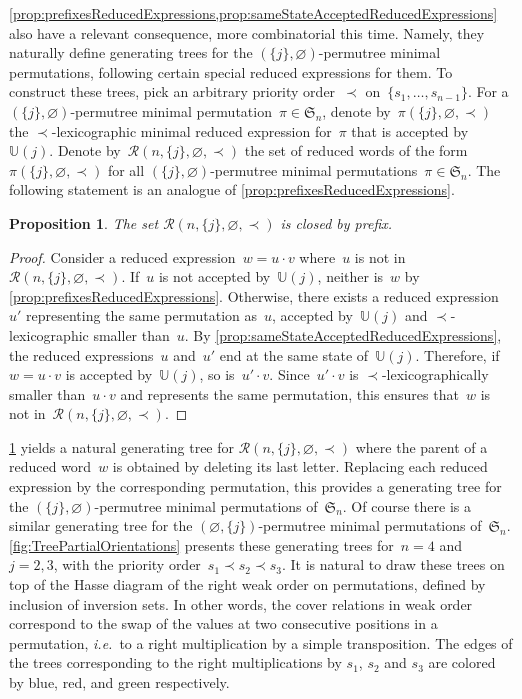 \documentclass{amsart}
\newtheorem{proposition}[theorem]{Proposition}
\newcommand{\fS}{\mathfrak{S}} %
\newcommand{\ie}{\textit{i.e.}~} %
\newcommand{\automatonU}{\mathbb{U}} %
\newcommand{\lexmin}{\mathcal{R}} %
\begin{document}
\cref{prop:prefixesReducedExpressions,prop:sameStateAcceptedReducedExpressions} also have a relevant consequence, more combinatorial this time.
Namely, they naturally define generating trees for the $(\{j\}, \varnothing)$-permutree minimal permutations, following certain special reduced expressions for them.
To construct these trees, pick an arbitrary priority order~$\prec$ on~$\{s_1, \dots, s_{n-1}\}$.
For a $(\{j\}, \varnothing)$-permutree minimal permutation~$\pi \in \fS_n$, denote by~$\pi(\{j\}, \varnothing, \prec)$ the $\prec$-lexicographic minimal reduced expression for~$\pi$ that is accepted by~$\automatonU(j)$.
Denote by~$\lexmin(n, \{j\}, \varnothing, \prec)$ the set of reduced words of the form~$\pi(\{j\}, \varnothing, \prec)$ for all $(\{j\}, \varnothing)$-permutree minimal permutations~$\pi \in \fS_n$.
The following statement is an analogue of \cref{prop:prefixesReducedExpressions}.

\begin{proposition}\label{prop:generatingTrees}
The set $\lexmin(n, \{j\}, \varnothing, \prec)$ is closed by prefix.
\end{proposition}

\begin{proof}
Consider a reduced expression~$w = u \cdot v$ where~$u$ is not in~$\lexmin(n, \{j\}, \varnothing, \prec)$.
If~$u$ is not accepted by~$\automatonU(j)$, neither is~$w$ by \cref{prop:prefixesReducedExpressions}.
Otherwise, there exists a reduced expression~$u'$ representing the same permutation as~$u$, accepted by~$\automatonU(j)$ and $\prec$-lexicographic smaller than~$u$.
By \cref{prop:sameStateAcceptedReducedExpressions}, the reduced expressions~$u$ and~$u'$ end at the same state of~$\automatonU(j)$.
Therefore, if~$w = u \cdot v$ is accepted by~$\automatonU(j)$, so is~$u' \cdot v$.
Since~$u' \cdot v$ is $\prec$-lexicographically smaller than~$u \cdot v$ and represents the same permutation, this ensures that~$w$ is not in~$\lexmin(n, \{j\}, \varnothing, \prec)$.
\end{proof}

\cref{prop:generatingTrees} yields a natural generating tree for $\lexmin(n, \{j\}, \varnothing, \prec)$ where the parent of a reduced word~$w$ is obtained by deleting its last letter.
Replacing each reduced expression by the corresponding permutation, this provides a generating tree for the $(\{j\}, \varnothing)$-permutree minimal permutations of~$\fS_n$.
Of course there is a similar generating tree for the $(\varnothing, \{j\})$-permutree minimal permutations of~$\fS_n$.
\cref{fig:TreePartialOrientations} presents these generating trees for~$n = 4$ and~$j = 2, 3$, with the priority order~$s_1 \prec s_2 \prec s_3$.
It is natural to draw these trees on top of the Hasse diagram of the right weak order on permutations, defined by inclusion of inversion sets.
In other words, the cover relations in weak order correspond to the swap of the values at two consecutive positions in a permutation, \ie to a right multiplication by a simple transposition.
The edges of the trees corresponding to the right multiplications by $s_1$, $s_2$ and $s_3$ are colored by blue, red, and green respectively.
\end{document}
